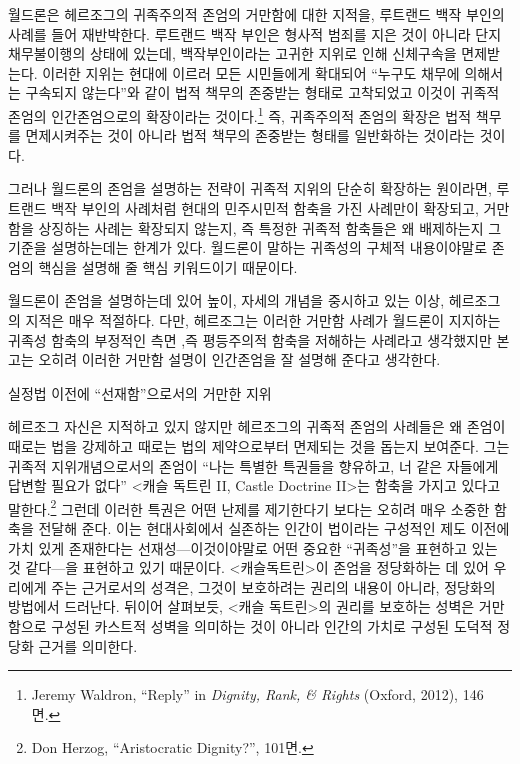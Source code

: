 월드론은 헤르조그의 귀족주의적 존엄의 거만함에 대한 지적을, 루트랜드 백작 부인의 사례를 들어 재반박한다. 루트랜드 백작 부인은 형사적 범죄를 지은 것이 아니라 단지 채무불이행의 상태에 있는데, 백작부인이라는 고귀한 지위로 인해 신체구속을 면제받는다. 이러한 지위는 현대에 이르러 모든 시민들에게 확대되어 ``누구도 채무에 의해서는 구속되지 않는다''와 같이 법적 책무의 존중받는 형태로 고착되었고 이것이 귀족적 존엄의 인간존엄으로의 확장이라는 것이다.\footnote{Jeremy Waldron, ``Reply'' in \emph{Dignity, Rank, \& Rights} (Oxford, 2012), 146면.} 즉, 귀족주의적 존엄의 확장은 법적 책무를 면제시켜주는 것이 아니라 법적 책무의 존중받는 형태를 일반화하는 것이라는 것이다.

그러나 월드론의 존엄을 설명하는 전략이 귀족적 지위의 단순히 확장하는 원이라면, 루트랜드 백작 부인의 사례처럼 현대의 민주시민적 함축을 가진 사례만이 확장되고, 거만함을 상징하는 사례는 확장되지 않는지, 즉 특정한 귀족적 함축들은 왜 배제하는지 그 기준을 설명하는데는 한계가 있다. 월드론이 말하는 귀족성의 구체적 내용이야말로 존엄의 핵심을 설명해 줄 핵심 키워드이기 때문이다.

월드론이 존엄을 설명하는데 있어 높이, 자세의 개념을 중시하고 있는 이상, 헤르조그의 지적은 매우 적절하다. 다만, 헤르조그는 이러한 거만함 사례가 월드론이 지지하는 귀족성 함축의 부정적인 측면 ,즉 평등주의적 함축을 저해하는 사례라고 생각했지만 본고는 오히려 이러한 거만함 설명이 인간존엄을 잘 설명해 준다고 생각한다.

실정법 이전에 ``선재함''으로서의 거만한 지위

헤르조그 자신은 지적하고 있지 않지만 헤르조그의 귀족적 존엄의 사례들은 왜 존엄이 때로는 법을 강제하고 때로는 법의 제약으로부터 면제되는 것을 돕는지 보여준다. 그는 귀족적 지위개념으로서의 존엄이 ``나는 특별한 특권들을 향유하고, 너 같은 자들에게 답변할 필요가 없다'' \textless 캐슬 독트린 II, Castle Doctrine II\textgreater 는 함축을 가지고 있다고 말한다.\footnote{Don Herzog, ``Aristocratic Dignity?'', 101면.} 그런데 이러한 특권은 어떤 난제를 제기한다기 보다는 오히려 매우 소중한 함축을 전달해 준다. 이는 현대사회에서 실존하는 인간이 법이라는 구성적인 제도 이전에 가치 있게 존재한다는 선재성---이것이야말로 어떤 중요한 ``귀족성''을 표현하고 있는 것 같다---을 표현하고 있기 때문이다. \textless 캐슬독트린\textgreater 이 존엄을 정당화하는 데 있어 우리에게 주는 근거로서의 성격은, 그것이 보호하려는 권리의 내용이 아니라, 정당화의 방법에서 드러난다. 뒤이어 살펴보듯, \textless 캐슬 독트린\textgreater 의 권리를 보호하는 성벽은 거만함으로 구성된 카스트적 성벽을 의미하는 것이 아니라 인간의 가치로 구성된 도덕적 정당화 근거를 의미한다.


